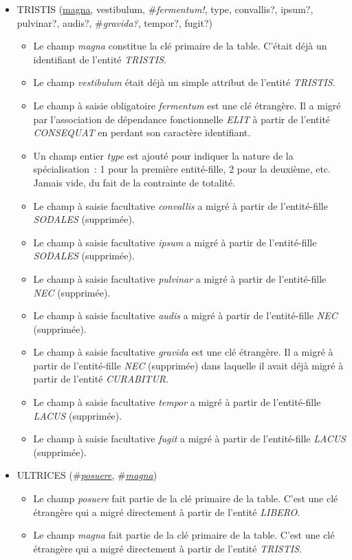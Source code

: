 \documentclass[a4paper]{article}
\newcommand{\relat}[1]{\textsc{#1}}
\newcommand{\attr}[1]{#1}
\newcommand{\prim}[1]{\uline{#1}}
\newcommand{\foreign}[1]{\#\textsl{#1}}
\begin{document}
\begin{itemize}
  \item \relat{TRISTIS} (\prim{magna}, \attr{vestibulum}, \foreign{fermentum!}, \attr{type}, \attr{convallis?}, \attr{ipsum?}, \attr{pulvinar?}, \attr{audis?}, \foreign{gravida?}, \attr{tempor?}, \attr{fugit?})
  \begin{itemize}
    \item Le champ \emph{magna} constitue la clé primaire de la table. C'était déjà un identifiant de l'entité \emph{TRISTIS}.
    \item Le champ \emph{vestibulum} était déjà un simple attribut de l'entité \emph{TRISTIS}.
    \item Le champ à saisie obligatoire \emph{fermentum} est une clé étrangère. Il a migré par l'association de dépendance fonctionnelle \emph{ELIT} à partir de l'entité \emph{CONSEQUAT} en perdant son caractère identifiant.
    \item Un champ entier \emph{type} est ajouté pour indiquer la nature de la spécialisation : 1 pour la première entité-fille, 2 pour la deuxième, etc. Jamais vide, du fait de la contrainte de totalité.
    \item Le champ à saisie facultative \emph{convallis} a migré à partir de l'entité-fille \emph{SODALES} (supprimée).
    \item Le champ à saisie facultative \emph{ipsum} a migré à partir de l'entité-fille \emph{SODALES} (supprimée).
    \item Le champ à saisie facultative \emph{pulvinar} a migré à partir de l'entité-fille \emph{NEC} (supprimée).
    \item Le champ à saisie facultative \emph{audis} a migré à partir de l'entité-fille \emph{NEC} (supprimée).
    \item Le champ à saisie facultative \emph{gravida} est une clé étrangère. Il a migré à partir de l'entité-fille \emph{NEC} (supprimée) dans laquelle il avait déjà migré à partir de l'entité \emph{CURABITUR}.
    \item Le champ à saisie facultative \emph{tempor} a migré à partir de l'entité-fille \emph{LACUS} (supprimée).
    \item Le champ à saisie facultative \emph{fugit} a migré à partir de l'entité-fille \emph{LACUS} (supprimée).
  \end{itemize}

  \item \relat{ULTRICES} (\foreign{\prim{posuere}}, \foreign{\prim{magna}})
  \begin{itemize}
    \item Le champ \emph{posuere} fait partie de la clé primaire de la table. C'est une clé étrangère qui a migré directement à partir de l'entité \emph{LIBERO}.
    \item Le champ \emph{magna} fait partie de la clé primaire de la table. C'est une clé étrangère qui a migré directement à partir de l'entité \emph{TRISTIS}.
  \end{itemize}

\end{itemize}
\end{document}
